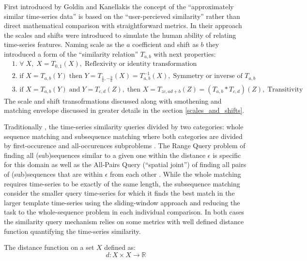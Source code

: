 First introduced by Goldin and Kanellakis \cite{citeulike:3815880} the concept of the ``approximately similar time-series data'' is based on the ``user-percieved similarity'' rather than direct mathematical comparison with straightforward metrics. In their approach the scales and shifts were introduced to simulate the human ability of relating time-series features. Naming scale as the $a$ coefficient and shift as $b$ they introduced a form of the ``similarity relation'' $T_{a,b}$ with next properties:
\begin{align}
 & \text{1. } \forall \; X, \; X=T_{0,1}(X), \; \text{Reflexivity or identity transformation} \\
 & \text{2. } \text{if } X=T_{a,b}(Y) \; \text{then } Y=T_{\frac{1}{a},-\frac{b}{a}}(X) = T^{-1}_{a,b}(X), \; \text{Symmetry or inverse of $T_{a,b}$} \\
 & \text{3. } \text{if } X=T_{a,b}(Y) \; \text{and} \; Y=T_{c,d}(Z), \; \text{then } X=T_{zc, ad+b}(Z) = (T_{a,b} * T_{c,d})(Z), \; \text{Transitivity}
\end{align}
The scale and shift transofrmations discussed along with smothening and matching envelope discussed in greater details in the section \ref{scales_and_shifts}.

Traditionally \cite{citeulike:3973409}, the time-series similarity queries divided by two categories: whole sequence matching and subsequence matching where both categories are divided by first-occurence and all-occurences subproblems \cite{citeulike:3815880}. The Range Query problem of finding all (sub)sequences similar to a given one within the distance $\epsilon$ is specific for this domain as well as the All-Pairs Query (``spatial joint'') of finding all pairs of (sub)sequences that are within $\epsilon$ from each other \cite{citeulike:3973409}. While the whole matching requires time-series to be exactly of the same length, the subsequence matching consider the smaller query time-series for which it finds the best match in the larger template time-series using the sliding-window approach and reducing the task to the whole-sequence problem in each individual comparison. In both cases the similarity query mechanism relies on some metrics with well defined distance function quantifying the time-series similarity. 

The distance function on a set $X$ defined as:
\begin{equation}
 d: X \times X \rightarrow \mathbb{R}
\end{equation}

